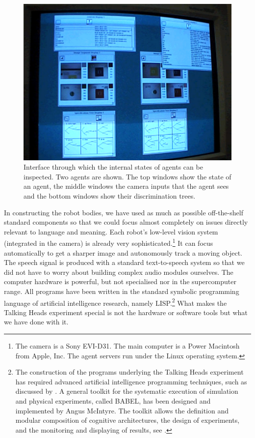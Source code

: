 \begin{figure}[htbp]
  \centerline{\includegraphics[width=.60\textwidth]{chap1/figs/Interface}}
\caption{ Interface through which the internal states of agents can 
be inspected. Two agents are shown. The top windows show the state of an agent, 
the middle windows the camera inputs that the agent sees and the bottom windows show 
their discrimination trees.}
\label{f:agentview}
\end{figure}

In constructing the robot bodies, we have used as much as
possible off-the-shelf standard 
components so that we could focus almost completely on issues
directly relevant to language and meaning.
Each robot's low-level vision system
(integrated in the camera) is already very sophisticated.\footnote{
The camera is a Sony EVI-D31. The main computer is a Power 
Macintosh from Apple, Inc. The agent servers run under the 
Linux operating system.}
It can focus automatically to get a sharper image
and autonomously track a moving object. The speech signal is 
produced with a standard text-to-speech system 
so that we did not have to 
worry about building complex audio modules ourselves.
The computer hardware 
is powerful, but not specialised nor in the supercomputer 
range. All programs have been written in the standard symbolic 
programming language of artificial intelligence 
research, namely LISP.\footnote{
The construction of the programs underlying the 
Talking Heads experiment has required advanced
artificial intelligence programming techniques, 
such as discussed by \cite{Norvig:1996}. A general
toolkit for the systematic execution of 
simulation and physical experiments, called BABEL, has been
designed and implemented by Angus McIntyre. The 
toolkit allows the definition and modular composition
of cognitive architectures, the design of 
experiments, and the monitoring and displaying of 
results, see \cite{McIntyre:1998}.} What makes the Talking Heads experiment
special is not the hardware or software tools
but what we have done with it.

